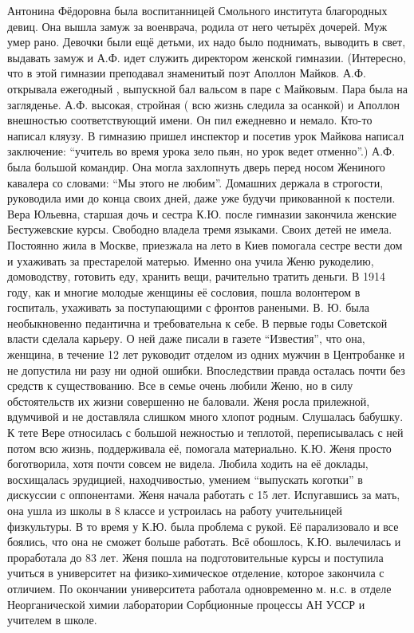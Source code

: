 Антонина Фёдоровна была воспитанницей Смольного института благородных девиц. Она вышла замуж за военврача, родила от него четырёх дочерей. Муж умер рано. Девочки были ещё детьми, их надо было поднимать, выводить в свет, выдавать замуж и А.Ф. идет служить директором женской гимназии. (Интересно, что в этой гимназии преподавал знаменитый поэт Аполлон Майков. А.Ф. открывала ежегодный , выпускной бал вальсом в паре с Майковым. Пара была на загляденье. А.Ф. высокая, стройная ( всю жизнь следила за осанкой) и Аполлон внешностью соответствующий имени. Он пил ежедневно и немало. Кто-то написал кляузу. В гимназию пришел инспектор и посетив урок Майкова написал заключение: “учитель во время урока зело пьян, но урок ведет отменно”.) А.Ф. была большой командир. Она могла захлопнуть дверь перед носом Жениного кавалера со словами: “Мы этого не любим”. Домашних держала в строгости, руководила ими до конца своих дней, даже уже будучи прикованной к постели.
Вера Юльевна, старшая дочь и сестра К.Ю. после гимназии закончила женские Бестужевские курсы. Свободно владела тремя языками. Своих детей не имела. Постоянно жила в Москве, приезжала на лето в Киев помогала сестре вести дом и ухаживать за престарелой матерью. Именно она учила Женю рукоделию, домоводству, готовить еду, хранить вещи, рачительно тратить деньги. В 1914 году, как и многие молодые женщины её сословия, пошла волонтером в госпиталь, ухаживать за поступающими с фронтов ранеными. В. Ю. была необыкновенно педантична и требовательна к себе. В первые годы Советской власти сделала карьеру. О ней даже писали в газете “Известия”, что она, женщина, в течение 12 лет руководит отделом из одних мужчин в Центробанке и не допустила ни разу ни одной ошибки. Впоследствии правда осталась почти без средств к существованию.
Все в семье очень любили Женю, но в силу обстоятельств их жизни совершенно не баловали. Женя росла прилежной, вдумчивой и не доставляла слишком много хлопот родным. Слушалась бабушку. К тете Вере относилась с большой нежностью и теплотой, переписывалась с ней потом всю жизнь, поддерживала её, помогала материально. К.Ю. Женя просто боготворила, хотя почти совсем не видела. Любила ходить на её доклады, восхищалась эрудицией, находчивостью, умением “выпускать коготки” в дискуссии с оппонентами.
Женя начала работать с 15 лет. Испугавшись за мать, она ушла из школы в 8 классе и устроилась на работу учительницей физкультуры. В то время у К.Ю. была проблема с рукой. Её парализовало и все боялись, что она не сможет больше работать. Всё обошлось, К.Ю. вылечилась и проработала до 83 лет. Женя пошла на подготовительные курсы и поступила учиться в университет на физико-химическое отделение, которое закончила с отличием. По окончании университета работала одновременно м. н.с. в отделе Неорганической химии лаборатории Сорбционные процессы АН УССР и учителем в школе.
